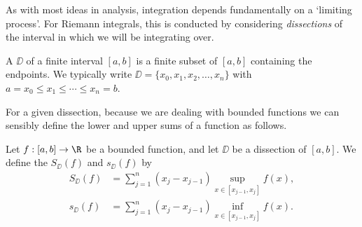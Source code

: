 As with most ideas in analysis, integration depends fundamentally on a `limiting process'. For Riemann integrals, this is conducted by considering \emph{dissections} of the interval in which we will be integrating over.

\begin{definition}[Dissection]
	A  $\DD$ of a finite interval $[a, b]$ is a finite subset of $[a, b]$ containing the endpoints. We typically write $\DD = \{x_0, x_1, x_2, \dots, x_n\}$ with $a = x_0 \leq x_1 \leq \cdots \leq x_n = b$.
\end{definition}

For a given dissection, because we are dealing with bounded functions we can sensibly define the lower and upper sums of a function as follows.

\begin{definition}
	Let $f: [a, b] \rightarrow \R$ be a bounded function, and let $\DD$ be a dissection of $[a, b]$. We define the  $S_{\DD}(f)$ and  $s_{\DD}(f)$ by
	\begin{align*}
		S_{\DD}(f) &= \sum_{j = 1}^n (x_j - x_{j - 1}) \sup_{x \in [x_{j - 1}, x_j]} f(x), \\
		s_{\DD}(f) &= \sum_{j = 1}^n (x_j - x_{j - 1}) \inf_{x \in [x_{j - 1}, x_j]} f(x).
	\end{align*}
\end{definition}



